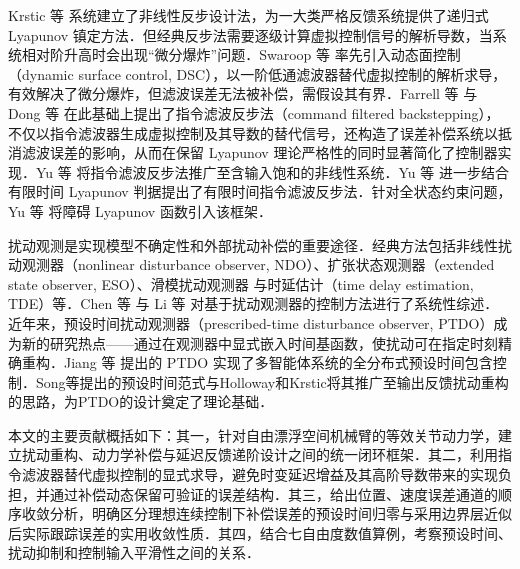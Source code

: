 \documentclass[12pt,a4paper]{article}
\theoremstyle{definition}
\theoremstyle{remark}
\begin{document}

Krstic 等\cite{krstic1995} 系统建立了非线性反步设计法，为一大类严格反馈系统提供了递归式 Lyapunov 镇定方法．但经典反步法需要逐级计算虚拟控制信号的解析导数，当系统相对阶升高时会出现“微分爆炸”问题．Swaroop 等\cite{swaroop2000} 率先引入动态面控制（dynamic surface control, DSC），以一阶低通滤波器替代虚拟控制的解析求导，有效解决了微分爆炸，但滤波误差无法被补偿，需假设其有界．Farrell 等\cite{farrell2009} 与 Dong 等\cite{dong2013} 在此基础上提出了指令滤波反步法（command filtered backstepping），不仅以指令滤波器生成虚拟控制及其导数的替代信号，还构造了误差补偿系统以抵消滤波误差的影响，从而在保留 Lyapunov 理论严格性的同时显著简化了控制器实现．Yu 等\cite{yu2015} 将指令滤波反步法推广至含输入饱和的非线性系统．Yu 等\cite{yu2018} 进一步结合有限时间 Lyapunov 判据提出了有限时间指令滤波反步法．针对全状态约束问题，Yu 等\cite{yu2019} 将障碍 Lyapunov 函数引入该框架．


扰动观测是实现模型不确定性和外部扰动补偿的重要途径．经典方法包括非线性扰动观测器（nonlinear disturbance observer, NDO）\cite{chen2000}、扩张状态观测器（extended state observer, ESO）\cite{han2009}、滑模扰动观测器\cite{shtessel2014} 与时延估计（time delay estimation, TDE）等．Chen 等\cite{chen2016} 与 Li 等\cite{li2014} 对基于扰动观测器的控制方法进行了系统性综述．近年来，预设时间扰动观测器（prescribed-time disturbance observer, PTDO）成为新的研究热点——通过在观测器中显式嵌入时间基函数，使扰动可在指定时刻精确重构．Jiang 等\cite{jiang2024} 提出的 PTDO 实现了多智能体系统的全分布式预设时间包含控制．Song等\cite{song2017}提出的预设时间范式与Holloway和Krstic\cite{holloway2019}将其推广至输出反馈扰动重构的思路，为PTDO的设计奠定了理论基础．


本文的主要贡献概括如下：其一，针对自由漂浮空间机械臂的等效关节动力学，建立扰动重构、动力学补偿与延迟反馈递阶设计之间的统一闭环框架．其二，利用指令滤波器替代虚拟控制的显式求导，避免时变延迟增益及其高阶导数带来的实现负担，并通过补偿动态保留可验证的误差结构．其三，给出位置、速度误差通道的顺序收敛分析，明确区分理想连续控制下补偿误差的预设时间归零与采用边界层近似后实际跟踪误差的实用收敛性质．其四，结合七自由度数值算例，考察预设时间、扰动抑制和控制输入平滑性之间的关系．
\end{document}
